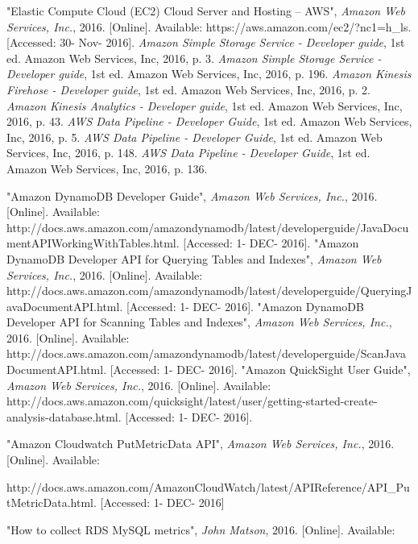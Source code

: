 \begin{thebibliography}{10}
   	"Elastic Compute Cloud (EC2) Cloud Server and Hosting – AWS", \textit{Amazon Web Services, Inc.}, 2016. [Online]. Available: https://aws.amazon.com/ec2/?nc1=h\_ls. [Accessed: 30- Nov- 2016].
    \textit{Amazon Simple Storage Service - Developer guide}, 1st ed. Amazon Web Services, Inc, 2016, p. 3.
  	\textit{Amazon Simple Storage Service - Developer guide}, 1st ed. Amazon Web Services, Inc, 2016, p. 196.
    \textit{Amazon Kinesis Firehose - Developer guide}, 1st ed. Amazon Web Services, Inc, 2016, p. 2.
  	\textit{Amazon Kinesis Analytics - Developer guide}, 1st ed. Amazon Web Services, Inc, 2016, p. 43.
  	\textit{AWS Data Pipeline - Developer Guide}, 1st ed. Amazon Web Services, Inc, 2016, p. 5.
  	\textit{AWS Data Pipeline - Developer Guide}, 1st ed. Amazon Web Services, Inc, 2016, p. 148.
  	\textit{AWS Data Pipeline - Developer Guide}, 1st ed. Amazon Web Services, Inc, 2016, p. 136.
  
  	"Amazon DynamoDB Developer Guide", \textit{Amazon Web Services, Inc.}, 2016. [Online]. Available: 	      http://docs.aws.amazon.com/amazondynamodb/latest/developerguide/JavaDocumentAPIWorkingWithTables.html. [Accessed: 1- DEC- 2016].
  	"Amazon DynamoDB Developer API for Querying Tables and Indexes", \textit{Amazon Web Services, Inc.}, 2016. [Online]. Available:
  http://docs.aws.amazon.com/amazondynamodb/latest/developerguide/QueryingJavaDocumentAPI.html. [Accessed: 1- DEC- 2016].
  	"Amazon DynamoDB Developer API for Scanning Tables and Indexes", \textit{Amazon Web Services, Inc.}, 2016. [Online]. Available:
  http://docs.aws.amazon.com/amazondynamodb/latest/developerguide/ScanJavaDocumentAPI.html. [Accessed: 1- DEC- 2016].
  	"Amazon QuickSight User Guide", \textit{Amazon Web Services, Inc.}, 2016. [Online]. Available:
  http://docs.aws.amazon.com/quicksight/latest/user/getting-started-create-analysis-database.html. [Accessed: 1- DEC- 2016].
  
	"Amazon Cloudwatch PutMetricData API", \textit{Amazon Web Services, Inc.}, 2016. [Online]. Available:
    
http://docs.aws.amazon.com/AmazonCloudWatch/latest/APIReference/API\_PutMetricData.html. [Accessed: 1- DEC- 2016]

	"How to collect RDS MySQL metrics", \textit{John Matson}, 2016. [Online]. Available:
    

\end{thebibliography}
